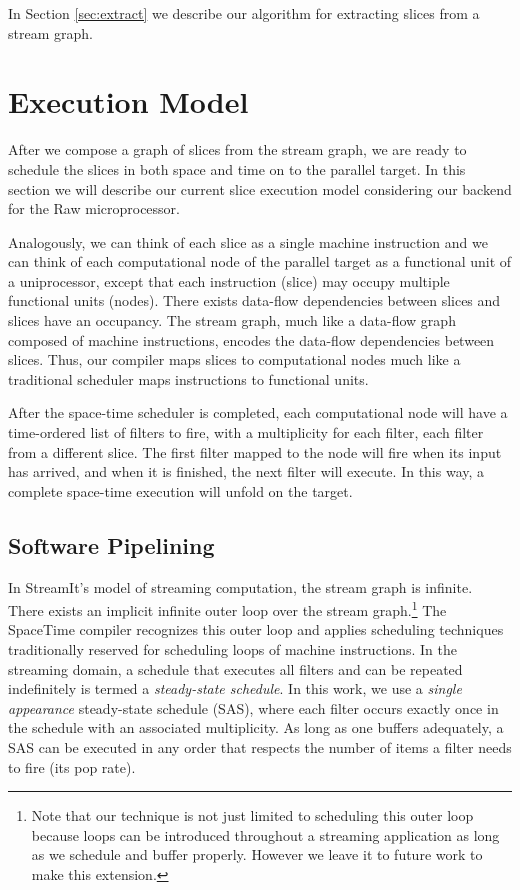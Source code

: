 In Section \ref{sec:extract} we describe our algorithm for extracting
slices from a stream graph.

\section{Execution Model}
After we compose a graph of slices from the stream graph, we are ready
to schedule the slices in both space and time on to the parallel
target.  In this section we will describe our current slice execution
model considering our backend for the Raw microprocessor.

Analogously, we can think of each slice as a single machine
instruction and we can think of each computational node of the
parallel target as a functional unit of a uniprocessor, except that
each instruction (slice) may occupy multiple functional units
(nodes). There exists data-flow dependencies between slices and slices
have an occupancy.  The stream graph, much like a data-flow graph
composed of machine instructions, encodes the data-flow dependencies
between slices. Thus, our compiler maps slices to computational nodes
much like a traditional scheduler maps instructions to functional
units.

After the space-time scheduler is completed, each computational node
will have a time-ordered list of filters to fire, with a multiplicity
for each filter, each filter from a different slice.  The first
filter mapped to the node will fire when its input has arrived, and
when it is finished, the next filter will execute.  In this way, a
complete space-time execution will unfold on the target.

\subsection{Software Pipelining}
\label{sec:softpipe}
In StreamIt's model of streaming computation, the stream graph is
infinite.  There exists an implicit infinite outer loop over the
stream graph.\footnote{Note that our technique is not just limited to
scheduling this outer loop because loops can be introduced throughout
a streaming application as long as we schedule and buffer properly.
However we leave it to future work to make this extension.}  The
SpaceTime compiler recognizes this outer loop and applies scheduling
techniques traditionally reserved for scheduling loops of machine
instructions.  In the streaming domain, a schedule that executes all
filters and can be repeated indefinitely is termed a {\it steady-state
schedule}.  In this work, we use a {\it single appearance}
steady-state schedule (SAS), where each filter occurs exactly once in
the schedule with an associated multiplicity.  As long as one buffers
adequately, a SAS can be executed in any order that respects the
number of items a filter needs to fire (its pop rate).


